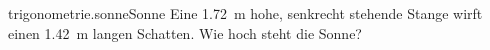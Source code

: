 \begin{exercise}{trigonometrie.sonne}{Sonne}
  \ifproblem\problem
    Eine \SI{1.72}{\metre} hohe, senkrecht stehende Stange
    wirft einen \SI{1.42}{\metre} langen Schatten.
    Wie hoch steht die Sonne?
  \fi
\end{exercise}
